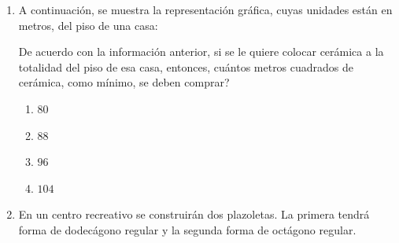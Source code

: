 \documentclass[11pt]{article}
\newcommand{\opcion}[2]{\item $#2$}
\newcommand{\puntografico}{0.09}
\begin{document}
\begin{enumerate}[label=\textbf{\arabic*.}, itemsep=2.5cm]
Si se desea crear un camino perpendicular al camino $m$ representado por $3y=kx-6$, entonces, \textquestiondown cu\'al es el valor de $k$?

\begin{enumerate}[label=\Alph*)]
  \item {}
  \item {}
  \item {}
  \item {}
\end{enumerate}

\Needspace{0.46\textheight}
\item
A continuaci\'on, se muestra la representaci\'on gr\'afica, cuyas unidades est\'an en metros, del piso de una casa:

\begin{center}
\end{center}

De acuerdo con la informaci\'on anterior, si se le quiere colocar cer\'amica a la totalidad del piso de esa casa, entonces, \textquestiondown cu\'antos metros cuadrados de cer\'amica, como m\'inimo, se deben comprar?

\begin{enumerate}[label=\Alph*)]
  \opcion{A}{80}
  \opcion{B}{88}
  \opcion{C}{96}
  \opcion{D}{104}
\end{enumerate}

\Needspace{0.78\textheight}
\item
En un centro recreativo se construir\'an dos plazoletas. La primera tendr\'a forma de dodec\'agono regular y la segunda forma de oct\'agono regular.


\end{enumerate}
\end{document}
